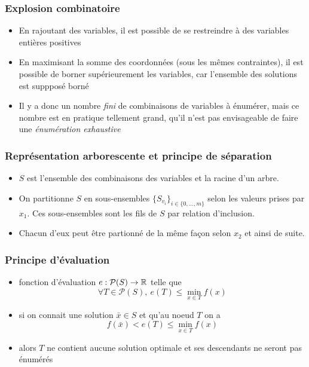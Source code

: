\documentclass{beamer}
\newcommand{\R}{{\ensuremath\mathbb{R}}}
\begin{document}
\begin{frame}
  \frametitle{Explosion combinatoire}

  \begin{itemize}
    \item En rajoutant des variables, il est possible de se restreindre à des variables entières positives %
    \item En maximisant la somme des coordonnées (sous les mêmes contraintes), il est possible de borner supérieurement les variables,
      car l'ensemble des solutions est suppposé borné%
    \item Il y a donc un nombre \emph{fini} de combinaisons de variables à énumérer, mais ce nombre est en pratique tellement grand, qu'il n'est pas envisageable de faire une \emph{énumération exhaustive}
  \end{itemize}

\end{frame}

\begin{frame}
  \frametitle{Représentation arborescente et principe de séparation}
  
  \begin{itemize}
    \item $S$ est l'ensemble des combinaisons des variables et la racine d'un arbre. 
    \item On partitionne $S$ en sous-ensembles
      $\{ S_{v_i} \}_{i \in \{0,\dots,m\}}$ selon les valeurs prises par $x_1$.
      Ces sous-ensembles sont les fils de $S$ par relation d'inclusion.
    \item Chacun d'eux peut être partionné de la même façon selon $x_2$ et ainsi de suite.
  \end{itemize}

  
\end{frame}

\begin{frame}
  \frametitle{Principe d'évaluation}

  \begin{itemize}
  \item fonction d'évaluation $e : \mathcal{P}(S) \rightarrow \R$ telle que
    \[ \forall T \in \mathcal{P}(S), \ e(T) \leq \min_{x \in T} f(x) \]
  \item si on connait une solution $\bar{x} \in S$ et qu'au noeud $T$ on a
    \[f(\bar{x}) < e(T) \leq \min_{x \in T} f(x) \]
  \item alors $T$ ne contient aucune solution optimale et ses descendants
    ne seront pas énumérés
  \end{itemize}

  
\end{frame}
\end{document}
